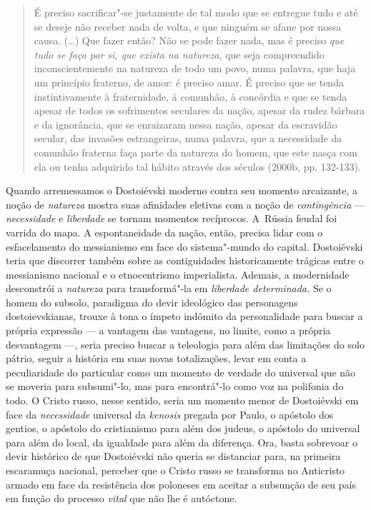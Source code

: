 \begin{quote}
É preciso sacrificar"-se justamente de tal modo que se entregue tudo e
até se deseje não receber nada de volta, e que ninguém se afane por
nossa causa. (\ldots) Que fazer então? Não se pode fazer nada, mas é
preciso \emph{que tudo se faça por si, que exista na natureza}, que seja
compreendido inconscientemente na natureza de todo um povo, numa
palavra, que haja um princípio fraterno, de amor: é preciso amar. É
preciso que se tenda instintivamente à fraternidade, à comunhão, à
concórdia e que se tenda apesar de todos os sofrimentos seculares da
nação, apesar da rudez bárbara e da ignorância, que se enraizaram nessa
nação, apesar da escravidão secular, das invasões estrangeiras, numa
palavra, que a necessidade da comunhão fraterna faça parte da natureza
do homem, que este nasça com ela ou tenha adquirido tal hábito através
dos séculos (2000b, pp. 132-133).
\end{quote}

Quando arremessamos o Dostoiévski moderno contra seu momento arcaizante,
a noção de \emph{natureza} mostra suas afinidades eletivas com a noção
de \emph{contingência} --- \emph{necessidade} e \emph{liberdade} se
tornam momentos recíprocos. A~Rússia feudal foi varrida do mapa. A
espontaneidade da nação, então, precisa lidar com o esfacelamento do
messianismo em face do sistema"-mundo do capital. Dostoiévski teria que
discorrer também sobre as contiguidades historicamente trágicas entre o
messianismo nacional e o etnocentrismo imperialista. Ademais, a
modernidade desconstrói a \emph{natureza} para transformá"-la em
\emph{liberdade determinada.} Se o homem do subsolo, paradigma do devir
ideológico das personagens dostoievskianas, trouxe à tona o ímpeto
indômito da personalidade para buscar a própria expressão --- a vantagem
das vantagens, no limite, como a própria desvantagem ---, seria preciso
buscar a teleologia para além das limitações do solo pátrio, seguir a
história em suas novas totalizações, levar em conta a peculiaridade do
particular como um momento de verdade do universal que não se moveria
para subsumi"-lo, mas para encontrá"-lo como voz na polifonia do todo. O
Cristo russo, nesse sentido, seria um momento menor de Dostoiévski em
face da \emph{necessidade} universal da \emph{kenosis} pregada por
Paulo, o apóstolo dos gentios, o apóstolo do cristianismo para além dos
judeus, o apóstolo do universal para além do local, da igualdade para
além da diferença. Ora, basta sobrevoar o devir histórico de que
Dostoiévski não queria se distanciar para, na primeira escaramuça
nacional, perceber que o Cristo russo se transforma no Anticristo armado
em face da resistência dos poloneses em aceitar a subsunção de seu país
em função do processo \emph{vital} que não lhe é autóctone.

